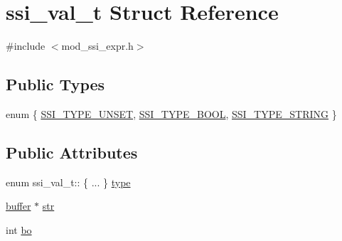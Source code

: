 \hypertarget{structssi__val__t}{\section{ssi\-\_\-val\-\_\-t Struct Reference}
\label{structssi__val__t}
}


{\ttfamily \#include $<$mod\-\_\-ssi\-\_\-expr.\-h$>$}

\subsection*{Public Types}
\begin{DoxyCompactItemize}
\item 
enum \{ \hyperlink{structssi__val__t_ac8e735f40c6fa157ef3375312acb84bba90b53e6edd82e037af4b53279c06d2a5}{S\-S\-I\-\_\-\-T\-Y\-P\-E\-\_\-\-U\-N\-S\-E\-T}, 
\hyperlink{structssi__val__t_ac8e735f40c6fa157ef3375312acb84bbae636ca8590078b48d67a82db6c592132}{S\-S\-I\-\_\-\-T\-Y\-P\-E\-\_\-\-B\-O\-O\-L}, 
\hyperlink{structssi__val__t_ac8e735f40c6fa157ef3375312acb84bbac946d5dd884042a4e824f2a55870689c}{S\-S\-I\-\_\-\-T\-Y\-P\-E\-\_\-\-S\-T\-R\-I\-N\-G}
 \}
\end{DoxyCompactItemize}
\subsection*{Public Attributes}
\begin{DoxyCompactItemize}
\item 
enum ssi\-\_\-val\-\_\-t\-:: \{ ... \}  \hyperlink{structssi__val__t_aa2681328d51ed332de8d1382e5061b39}{type}
\item 
\hyperlink{structbuffer}{buffer} $\ast$ \hyperlink{structssi__val__t_acb17e14e911669ff1bdbdbfe8e118916}{str}
\item 
int \hyperlink{structssi__val__t_a6352b924d470f6de74bf929c824224c7}{bo}
\end{DoxyCompactItemize}


